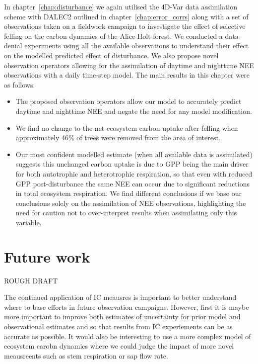 In chapter~\ref{chap:disturbance} we again utilised the 4D-Var data assimilation scheme with DALEC2 outlined in chapter~\ref{chap:error_corrs} along with a set of observations taken on a fieldwork campaign to investigate the effect of selective felling on the carbon dynamics of the Alice Holt forest. We conducted a data-denial experiments using all the available observations to understand their effect on the modelled predicted effect of disturbance. We also propose novel observation operators allowing for the assimilation of daytime and nighttime NEE observations with a daily time-step model. The main results in this chapter were as follows:
\begin{itemize}
\item The proposed observation operators allow our model to accurately predict daytime and nighttime NEE and negate the need for any model modification. 
\item We find no change to the net ecosystem carbon uptake after felling when approximately 46\% of trees were removed from the area of interest.
\item Our most confident modelled estimate (when all available data is assimilated) suggests this unchanged carbon uptake is due to GPP being the main driver for both autotrophic and heterotrophic respiration, so that even with reduced GPP post-disturbance the same NEE can occur due to significant reductions in total ecosystem respiration. We find different conclusions if we base our conclusions solely on the assimilation of NEE observations, highlighting the need for caution not to over-interpret results when assimilating only this variable. 
\end{itemize}

\section{Future work}

ROUGH DRAFT

The continued application of IC meausres is important to better understand where to base efforts in future observation campaigns. However, first it is maybe more important to improve both estimates of uncertainty for prior model and observational estimates and so that results from IC experiements can be as accurate as possible. It would also be interesting to use a more complex model of ecosystem carobn dynamics where we could judge the impact of more novel meausreents such as stem respiration or sap flow rate.

